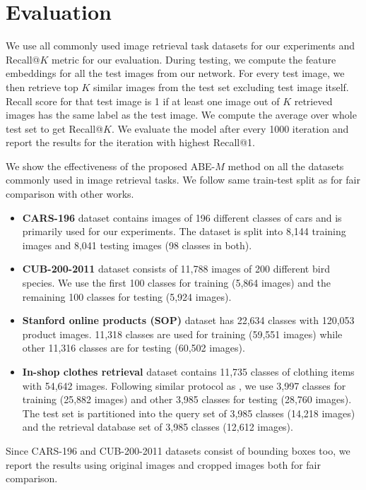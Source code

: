 \documentclass[runningheads]{llncs}
\begin{document}
\section{Evaluation}
\vspace{-3mm}
We use all commonly used image retrieval task datasets for our experiments and Recall@$K$ metric for our evaluation.
During testing, we compute the feature embeddings for all the test images from our network.
For every test image, we then retrieve top $K$ similar images from the test set excluding test image itself.
Recall score for that test image is 1 if at least one image out of $K$ retrieved images has the same label as the test image.
We compute the average over whole test set to get Recall@$K$.
We evaluate the model after every 1000 iteration and report the results for the iteration with highest Recall@1.

We show the effectiveness of the proposed ABE-$M$ method on all the datasets commonly used in image retrieval tasks. We follow same train-test split as \cite{oh2016deep} for fair comparison with other works.
\begin{itemize}
\item \textbf{CARS-196} \cite{KrauseStarkDengFei-Fei_3DRR2013} dataset contains images of 196 different classes of cars and is primarily used for our experiments. The dataset is split into 8,144 training images and 8,041 testing images (98 classes in both).
\item \textbf{CUB-200-2011} \cite{WahCUB_200_2011} dataset consists of 11,788 images of 200 different bird species. We use the first 100 classes for training (5,864 images) and the remaining 100 classes for testing (5,924 images).
\item \textbf{Stanford online products (SOP)} \cite{oh2016deep} dataset has 22,634 classes with 120,053 product images. 11,318 classes are used for training (59,551 images) while other 11,316 classes are for testing (60,502 images).
\item \textbf{In-shop clothes retrieval} \cite{liu2016deepfashion} dataset contains 11,735 classes of clothing items with 54,642 images. Following similar protocol as \cite{oh2016deep}, we use 3,997 classes for training (25,882 images) and other 3,985 classes for testing (28,760 images). The test set is partitioned into the query set of 3,985 classes (14,218 images) and the retrieval database set of 3,985 classes (12,612 images).
\end{itemize}
Since CARS-196 and CUB-200-2011 datasets consist of bounding boxes too, we report the results using original images and cropped images both for fair comparison. \iffalse Following the approach in \cite{wu2017sampling}, for CARS196 cropped dataset, we scale the cropped images to 256x256; and for CUB200 cropped, we scale and pad the images such that their longer side is 256 pixels, keeping the aspect ratio fixed.\fi
 
\end{document}
